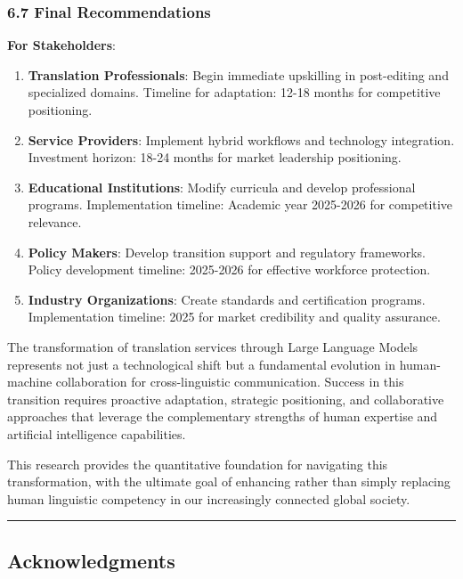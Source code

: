 \documentclass[12pt,a4paper]{article}
\begin{document}
{{{{{\hypertarget{final-recommendations}{%
\subsubsection{6.7 Final Recommendations}\label{final-recommendations}}

\textbf{For Stakeholders}:

\begin{enumerate}
\def\labelenumi{\arabic{enumi}.}
\item
  \textbf{Translation Professionals}: Begin immediate upskilling in
  post-editing and specialized domains. Timeline for adaptation: 12-18
  months for competitive positioning.
\item
  \textbf{Service Providers}: Implement hybrid workflows and technology
  integration. Investment horizon: 18-24 months for market leadership
  positioning.
\item
  \textbf{Educational Institutions}: Modify curricula and develop
  professional programs. Implementation timeline: Academic year
  2025-2026 for competitive relevance.
\item
  \textbf{Policy Makers}: Develop transition support and regulatory
  frameworks. Policy development timeline: 2025-2026 for effective
  workforce protection.
\item
  \textbf{Industry Organizations}: Create standards and certification
  programs. Implementation timeline: 2025 for market credibility and
  quality assurance.
\end{enumerate}

The transformation of translation services through Large Language Models
represents not just a technological shift but a fundamental evolution in
human-machine collaboration for cross-linguistic communication. Success
in this transition requires proactive adaptation, strategic positioning,
and collaborative approaches that leverage the complementary strengths
of human expertise and artificial intelligence capabilities.

This research provides the quantitative foundation for navigating this
transformation, with the ultimate goal of enhancing rather than simply
replacing human linguistic competency in our increasingly connected
global society.

\begin{center}\rule{0.5\linewidth}{0.5pt}\end{center}

\hypertarget{acknowledgments}{%
\subsection{Acknowledgments}\label{acknowledgments}}

}}}}}
\end{document}
